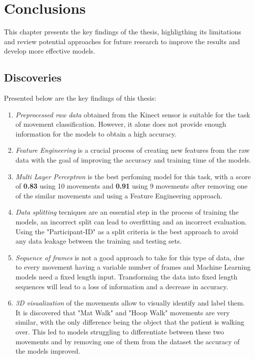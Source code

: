 \hypersetup{colorlinks=true, linkcolor=blue, citecolor=red}

\chapter{Conclusions} \label{chap:conclusions}

    This chapter presents the key findings of the thesis, highligthing its limitations and review potential approaches for future research to improve the results and develop more effective models.

    \section{Discoveries}

        Presented below are the key findings of this thesis: 
        \begin{enumerate}
            \item \textit{Preprocessed raw data} obtained from the Kinect sensor is suitable for the task of movement classification. However, it alone does not provide enough information for the models to obtain a high accuracy.
            \item \textit{Feature Engineering} is a crucial process of creating new features from the raw data with the goal of improving the accuracy and training time of the models.
            \item \textit{Multi Layer Perceptron} is the best perfoming model for this task, with a score of \textbf{0.83} using 10 movements and \textbf{0.91} using 9 movements after removing one of the similar movements and using a Feature Engineering approach.
            \item \textit{Data splitting} tecniques are an essential step in the process of training the models, an incorrect split can lead to overfitting and an incorrect evaluation. Using the "Participant-ID" as a split criteria is the best approach to avoid any data leakage between the training and testing sets.
            \item \textit{Sequence of frames} is not a good approach to take for this type of data, due to every movement having a variable number of frames and Machine Learning models need a fixed length input. Transforming the data into fixed length sequences will lead to a loss of information and a decrease in accuracy.
            \item \textit{3D visualization} of the movements allow to visually identify and label them. It is discovered that "Mat Walk" and "Hoop Walk" movements are very similar, with the only difference being the object that the patient is walking over. This led to models struggling to differentiate between these two movements and by removing one of them from the dataset the accuracy of the models improved.
        \end{enumerate}
    
